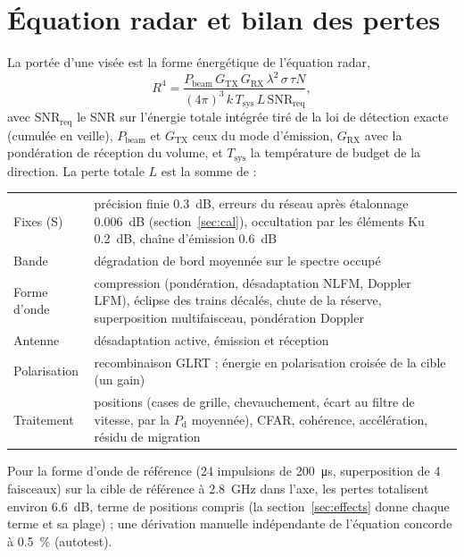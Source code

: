\documentclass[11pt,a4paper]{article}
\newcommand{\Tsys}{T_{\mathrm{sys}}}
\newcommand{\SNR}{\mathrm{SNR}}
\newcommand{\Pd}{P_{\mathrm d}}
\begin{document}
\section{Équation radar et bilan des pertes}\label{sec:solve}
La portée d'une visée est la forme énergétique de l'équation radar,
\[
  R^4 = \frac{P_{\mathrm{beam}}\,G_{\mathrm{TX}}\,G_{\mathrm{RX}}\,\lambda^2\,\sigma\,\tau N}
             {(4\pi)^3\,k\,\Tsys\,L\,\SNR_{\mathrm{req}}},
\]
avec $\SNR_{\mathrm{req}}$ le SNR sur l'énergie totale intégrée tiré de la loi de détection exacte (cumulée en veille),
$P_{\mathrm{beam}}$ et $G_{\mathrm{TX}}$ ceux du mode d'émission, $G_{\mathrm{RX}}$ avec la pondération de réception du
volume, et $\Tsys$ la température de budget de la direction. La perte totale $L$ est la somme de :
\begin{center}
\begin{tabularx}{\linewidth}{@{}lL@{}}
\toprule
Fixes (S) & précision finie \SI{0.3}{dB}, erreurs du réseau après étalonnage \SI{0.006}{dB} (section~\ref{sec:cal}),
occultation par les éléments Ku \SI{0.2}{dB}, chaîne d'émission \SI{0.6}{dB}\\
Bande & dégradation de bord moyennée sur le spectre occupé\\
Forme d'onde & compression (pondération, désadaptation NLFM, Doppler LFM), éclipse des trains décalés, chute de la
réserve, superposition multifaisceau, pondération Doppler\\
Antenne & désadaptation active, émission et réception\\
Polarisation & recombinaison GLRT ; énergie en polarisation croisée de la cible (un gain)\\
Traitement & positions (cases de grille, chevauchement, écart au filtre de vitesse, par la $\Pd$ moyennée), CFAR,
cohérence, accélération, résidu de migration\\
\bottomrule
\end{tabularx}
\end{center}
Pour la forme d'onde de référence (24 impulsions de \SI{200}{\micro s}, superposition de 4 faisceaux) sur la cible de
référence à \SI{2.8}{GHz} dans l'axe, les pertes totalisent environ \SI{6.6}{dB}, terme de positions compris (la
section~\ref{sec:effects} donne chaque terme et sa plage) ; une dérivation manuelle indépendante de l'équation concorde
à \SI{0.5}{\percent} (autotest).
\end{document}
